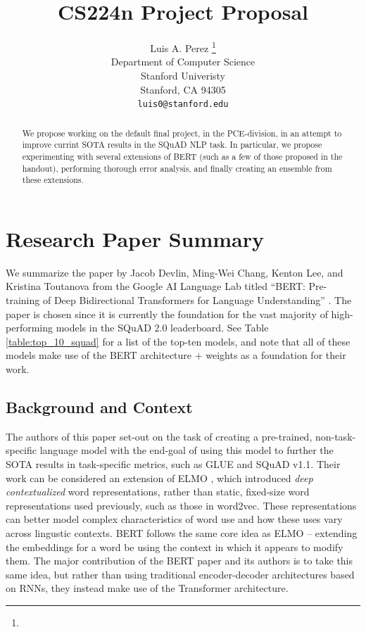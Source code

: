 \documentclass{article}
\title{CS224n Project Proposal}
\author{
  Luis A. Perez \thanks{} \\
  Department of Computer Science\\
  Stanford Univeristy\\
  Stanford, CA 94305 \\
  \texttt{luis0@stanford.edu} \\
}
\begin{document}

\maketitle

\begin{abstract}
  We propose working on the default final project, in the PCE-division, in an attempt to improve currint SOTA results in the SQuAD NLP task. In particular, we propose experimenting with several extensions of BERT \cite{BERT} (such as a few of those proposed in the handout), performing thorough error analysis, and finally creating an ensemble from these extensions. 
\end{abstract}

\section{Research Paper Summary}
We summarize the paper by Jacob Devlin, Ming-Wei Chang, Kenton Lee, and Kristina Toutanova from the Google AI Language Lab titled ``BERT: Pre-training of Deep Bidirectional Transformers for Language Understanding'' \cite{BERT}. The paper is chosen since it is currently the foundation for the vast majority of high-performing models in the SQuAD 2.0 leaderboard. See Table \ref{table:top_10_squad} for a list of the top-ten models, and note that all of these models make use of the BERT architecture + weights as a foundation for their work. 

\subsection{Background and Context}
The authors of this paper set-out on the task of creating a pre-trained, non-task-specific language model with the end-goal of using this model to further the SOTA results in task-specific metrics, such as GLUE and SQuAD v1.1. Their work can be considered an extension of ELMO \cite{ELMO}, which introduced \textit{deep contextualized} word representations, rather than static, fixed-size word representations used previously, such as those in word2vec. These representations can better model complex characteristics of word use and how these uses vary across lingustic contexts. BERT follows the same core idea as ELMO -- extending the embeddings for a word be using the context in which it appears to modify them. The major contribution of the BERT \cite{BERT} paper and its authors is to take this same idea, but rather than using traditional encoder-decoder architectures based on RNNs, they instead make use of the Transformer architecture. 
\end{document}
